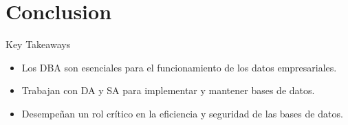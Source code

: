 \documentclass{beamer}
\begin{document}
\section{Conclusion}

\begin{frame}{Key Takeaways}
    \begin{itemize}
        \item Los DBA son esenciales para el funcionamiento de los datos empresariales.
        \item Trabajan con DA y SA para implementar y mantener bases de datos.
        \item Desempeñan un rol crítico en la eficiencia y seguridad de las bases de datos.
    \end{itemize}
\end{frame}
\end{document}
